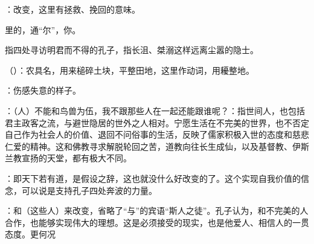 {：改变，这里有拯救、挽回的意味。
\item {}里的，通“尔”，你。
\item {}指四处寻访明君而不得的孔子，指长沮、桀溺这样远离尘嚣的隐士。
\item {}（）：农具名，用来槌碎土块，平整田地，这里作动词，用耰整地。
\item {}：伤感失意的样子。
\item {}：（人）不能和鸟兽为伍，我不跟那些人在一起还能跟谁呢？：指世间人，也包括君主政客之流，与避世隐居的世外之人相对。宁愿生活在不完美的世界，也不否定自己作为社会人的价值、退回不问俗事的生活，反映了儒家积极入世的态度和慈悲仁爱的精神。这和佛教寻求解脱轮回之苦，道教向往长生成仙，以及基督教、伊斯兰教宣扬的天堂，都有极大不同。
\item {}：即天下若有道，是假设之辞，这也就没什么好改变的了。这个实现自我价值的信念，可以说是支持孔子四处奔波的力量。
\item {}：和（这些人）来改变，省略了“与”的宾语“斯人之徒”。孔子认为，和不完美的人合作，也能够实现伟大的理想。这是必须接受的现实，也是他爱人、相信人的一贯态度。更何况  
}
{}  %


